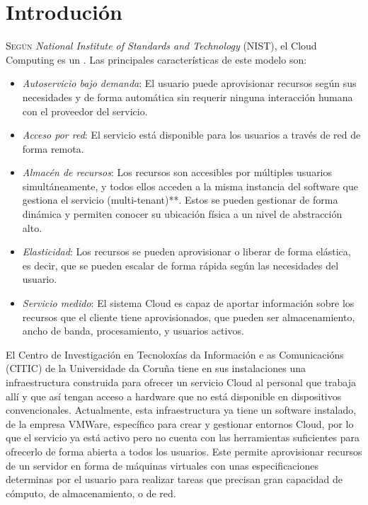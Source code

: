 \chapter{Introdución}
\label{chap:introducion}
\lettrine{S}{egún} \textit{National Institute of Standards and Technology} (NIST), el Cloud Computing es un \cite{DefCloudComputing}. Las principales características de este modelo son\label{nist}:
\begin{itemize}
    \item \emph{Autoservicio bajo demanda}: El usuario puede aprovisionar recursos según sus necesidades y de forma automática sin requerir ninguna interacción humana con el proveedor del servicio.
    \item \emph{Acceso por red}: El servicio está disponible para los usuarios a través de red de forma remota.
    \item \emph{Almacén de recursos}: Los recursos son accesibles por múltiples usuarios simultáneamente, y todos ellos acceden a la misma instancia del software que gestiona el servicio (multi-tenant)**. Estos se pueden gestionar de forma dinámica y permiten conocer su ubicación física a un nivel de abstracción alto.
    \item \emph{Elasticidad}: Los recursos se pueden aprovisionar o liberar de forma elástica, es decir, que se pueden escalar de forma rápida según las necesidades del usuario.
    \item \emph{Servicio medido}: El sistema Cloud es capaz de aportar información sobre los recursos que el cliente tiene aprovisionados, que pueden ser almacenamiento, ancho de banda, procesamiento, y usuarios activos.
\end{itemize}
 
 El Centro de Investigación en Tecnoloxías da Información e as Comunicacións (CITIC) de la Universidade da Coruña tiene en sus instalaciones una infraestructura construida para ofrecer un servicio Cloud al personal que trabaja allí y que así tengan acceso a hardware que no está disponible en dispositivos convencionales. Actualmente, esta infraestructura ya tiene un software instalado, de la empresa VMWare, específico para crear y gestionar entornos Cloud, por lo que el servicio ya está activo pero no cuenta con las herramientas suficientes para ofrecerlo de forma abierta a todos los usuarios. Este permite aprovisionar recursos de un servidor en forma de máquinas virtuales con unas especificaciones determinas por el usuario para realizar tareas que precisan gran capacidad de cómputo, de almacenamiento, o de red.\\
 
